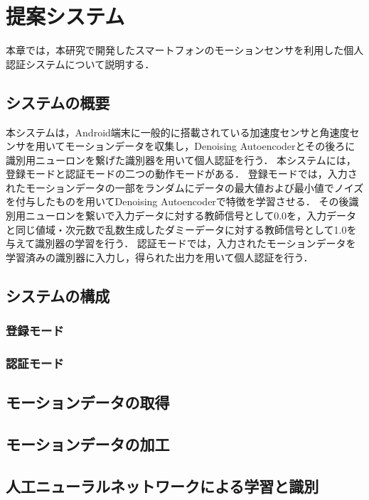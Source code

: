 \chapter{提案システム}
本章では，本研究で開発したスマートフォンのモーションセンサを利用した個人認証システムについて説明する．

\section{システムの概要}
本システムは，Android端末に一般的に搭載されている加速度センサと角速度センサを用いてモーションデータを収集し，Denoising Autoencoderとその後ろに識別用ニューロンを繋げた識別器を用いて個人認証を行う．
本システムには，登録モードと認証モードの二つの動作モードがある．
登録モードでは，入力されたモーションデータの一部をランダムにデータの最大値および最小値でノイズを付与したものを用いてDenoising Autoencoderで特徴を学習させる．
その後識別用ニューロンを繋いで入力データに対する教師信号として0.0を，入力データと同じ値域・次元数で乱数生成したダミーデータに対する教師信号として1.0を与えて識別器の学習を行う．
認証モードでは，入力されたモーションデータを学習済みの識別器に入力し，得られた出力を用いて個人認証を行う．


\section{システムの構成}

\subsection{登録モード}

\subsection{認証モード}

\section{モーションデータの取得}

\section{モーションデータの加工}

\section{人工ニューラルネットワークによる学習と識別}
